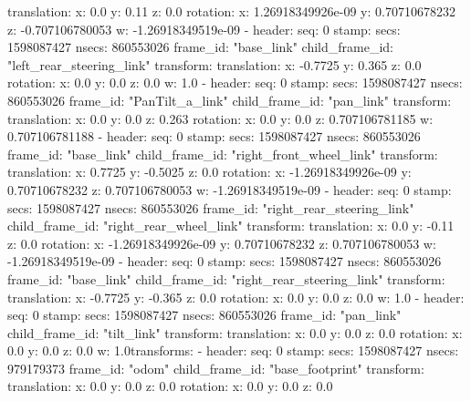       translation: 
        x: 0.0
        y: 0.11
        z: 0.0
      rotation: 
        x: 1.26918349926e-09
        y: 0.70710678232
        z: -0.707106780053
        w: -1.26918349519e-09
  - 
    header: 
      seq: 0
      stamp: 
        secs: 1598087427
        nsecs: 860553026
      frame_id: "base_link"
    child_frame_id: "left_rear_steering_link"
    transform: 
      translation: 
        x: -0.7725
        y: 0.365
        z: 0.0
      rotation: 
        x: 0.0
        y: 0.0
        z: 0.0
        w: 1.0
  - 
    header: 
      seq: 0
      stamp: 
        secs: 1598087427
        nsecs: 860553026
      frame_id: "PanTilt_a_link"
    child_frame_id: "pan_link"
    transform: 
      translation: 
        x: 0.0
        y: 0.0
        z: 0.263
      rotation: 
        x: 0.0
        y: 0.0
        z: 0.707106781185
        w: 0.707106781188
  - 
    header: 
      seq: 0
      stamp: 
        secs: 1598087427
        nsecs: 860553026
      frame_id: "base_link"
    child_frame_id: "right_front_wheel_link"
    transform: 
      translation: 
        x: 0.7725
        y: -0.5025
        z: 0.0
      rotation: 
        x: -1.26918349926e-09
        y: 0.70710678232
        z: 0.707106780053
        w: -1.26918349519e-09
  - 
    header: 
      seq: 0
      stamp: 
        secs: 1598087427
        nsecs: 860553026
      frame_id: "right_rear_steering_link"
    child_frame_id: "right_rear_wheel_link"
    transform: 
      translation: 
        x: 0.0
        y: -0.11
        z: 0.0
      rotation: 
        x: -1.26918349926e-09
        y: 0.70710678232
        z: 0.707106780053
        w: -1.26918349519e-09
  - 
    header: 
      seq: 0
      stamp: 
        secs: 1598087427
        nsecs: 860553026
      frame_id: "base_link"
    child_frame_id: "right_rear_steering_link"
    transform: 
      translation: 
        x: -0.7725
        y: -0.365
        z: 0.0
      rotation: 
        x: 0.0
        y: 0.0
        z: 0.0
        w: 1.0
  - 
    header: 
      seq: 0
      stamp: 
        secs: 1598087427
        nsecs: 860553026
      frame_id: "pan_link"
    child_frame_id: "tilt_link"
    transform: 
      translation: 
        x: 0.0
        y: 0.0
        z: 0.0
      rotation: 
        x: 0.0
        y: 0.0
        z: 0.0
        w: 1.0transforms: 
  - 
    header: 
      seq: 0
      stamp: 
        secs: 1598087427
        nsecs: 979179373
      frame_id: "odom"
    child_frame_id: "base_footprint"
    transform: 
      translation: 
        x: 0.0
        y: 0.0
        z: 0.0
      rotation: 
        x: 0.0
        y: 0.0
        z: 0.0
